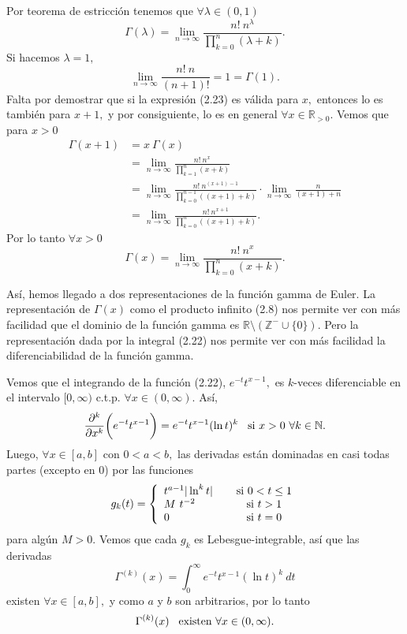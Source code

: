 Por teorema de estricción tenemos que $\forall \lambda \in (0,1)$
\begin{equation}
	\Gamma(\lambda) = \lim_{n \rightarrow \infty}\frac{n!\ n^\lambda}{\prod_{k = 0}^{n}(\lambda+k)}.
\end{equation}
Si hacemos $\lambda = 1,$ $$\lim_{n \rightarrow \infty}\frac{n!\ n}{(n+1)!} = 1 = \Gamma(1).$$ Falta por demostrar que si la expresión (2.23) es válida para $x,$ entonces lo es también para $x+1,$ y por consiguiente, lo es en general $\forall x \in \mathbb{R}_{>0}.$ Vemos que para $x > 0$
\begin{align*}
	\Gamma(x+1) &= x\ \Gamma(x)\\
	&= \lim_{n \rightarrow \infty}\frac{n!\ n^x}{\prod_{k = 1}^{n}(x+k)}\\
	&= \lim_{n \rightarrow \infty}\frac{n!\ n^{(x+1)-1}}{\prod_{k = 0}^{n-1}((x+1)+k)}\cdot\lim_{n \rightarrow \infty}\frac{n}{(x+1)+n}\\
	&= \lim_{n \rightarrow \infty}\frac{n!\ n^{x+1}}{\prod_{k = 0}^{n}((x+1)+k)}.
\end{align*}
Por lo tanto $\forall x > 0$ $$\Gamma(x) = \lim_{n \rightarrow \infty}\frac{n!\ n^x}{\prod_{k = 0}^{n}(x+k)}.$$

Así, hemos llegado a dos representaciones de la función gamma de Euler. La representación de $\Gamma(x)$ como el producto infinito (2.8) nos permite ver con más facilidad que el dominio de la función gamma es $\mathbb{R}\texttt{\textbackslash}(\mathbb{Z}^-\cup \{0\}).$ Pero la representación dada por la integral (2.22) nos permite ver con más facilidad la diferenciabilidad de la función gamma.

Vemos que el integrando de la función (2.22), $e^{-t}t^{x-1},$ es $k$-veces diferenciable en el intervalo $[0,\infty)$ c.t.p. $\forall x \in (0,\infty).$ Así, $$\frac{\partial^k}{\partial x^k}\bigg(e^{-t}t^{x-1}\bigg) = e^{-t}t^{x-1}(\ln t)^k\hspace{0.3cm}\textrm{si }x > 0\ \forall k \in \mathbb{N}.$$ Luego, $\forall x \in [a,b]$ con $0 < a < b,$ las derivadas están dominadas en casi todas partes (excepto en 0) por las funciones \[
g_k(t) = \left\{
\begin{array}{lcl}
t^{a-1}|\ln^k t|\hspace{0.4cm}&\mbox{si }0 < t \leq 1\\
M\ t^{-2} &\mbox{si }t > 1\\
0 &\mbox{si }t = 0
\end{array}\right.\] para algún $M > 0.$ Vemos que cada $g_k$ es Lebesgue-integrable, así que las derivadas $$\Gamma^{(k)}(x) = \int_{0}^{\infty}e^{-t}t^{x-1}(\ln t)^k\ dt$$ existen $\forall x \in [a,b],$ y como $a$ y $b$ son arbitrarios, por lo tanto $$\Gamma^{(k)}(x)\hspace{0.3cm}\textrm{existen }\forall x \in (0,\infty).$$
